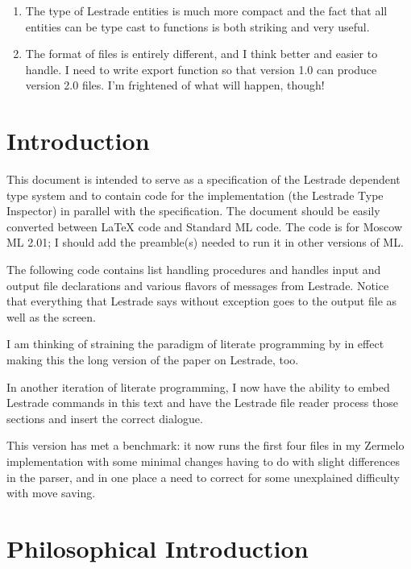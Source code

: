 \documentclass[12pt]{article}
\begin{document}
\begin{description}
\begin{enumerate}
\item  The type of Lestrade entities is much more compact and the fact that all entities can
be type cast to functions is both striking and very useful.

\item  The format of files is entirely different, and I think better and easier to handle.  I need to write export function so that version 1.0 can produce version 2.0 files.  I'm frightened of what will happen, though!

\end{enumerate}



\end{description}

\newpage

\section{Introduction}

This document is intended to serve as a specification of the Lestrade dependent type system and to contain code for the implementation (the Lestrade Type Inspector)  in parallel with the specification.  The document
should be easily converted between LaTeX code and Standard ML code.  The code is for Moscow ML 2.01;  I should add the preamble(s) needed to run it in other versions of ML.

The following code contains list handling procedures and handles input and output file declarations and various flavors of messages from Lestrade.  Notice that everything
that Lestrade says without exception goes to the output file as well as the screen.

I am thinking of straining the paradigm of literate programming by in effect making this the long version of the paper on Lestrade, too.

In another iteration of literate programming, I now have the ability to embed Lestrade commands in this text and have the Lestrade file reader process those sections
and insert the correct dialogue.

This version has met a benchmark:  it now runs the first four files in my Zermelo implementation with some minimal changes having to do with slight differences in the parser,
and in one place a need to correct for some unexplained difficulty with move saving.

\newpage

\section{Philosophical Introduction}
\end{document}
